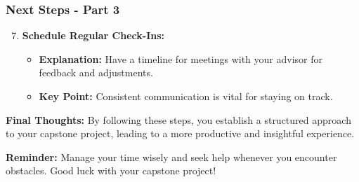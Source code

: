 \documentclass[aspectratio=169]{beamer}
\begin{document}
\begin{frame}[fragile]
    \frametitle{Next Steps - Part 3}
    \begin{enumerate}\setcounter{enumi}{6}
        \item \textbf{Schedule Regular Check-Ins:}
        \begin{itemize}
            \item \textbf{Explanation:} Have a timeline for meetings with your advisor for feedback and adjustments.
            \item \textbf{Key Point:} Consistent communication is vital for staying on track.
        \end{itemize}
    \end{enumerate}

    \textbf{Final Thoughts:} 
    By following these steps, you establish a structured approach to your capstone project, leading to a more productive and insightful experience.

    \textbf{Reminder:} 
    Manage your time wisely and seek help whenever you encounter obstacles. Good luck with your capstone project!
\end{frame}
\end{document}
